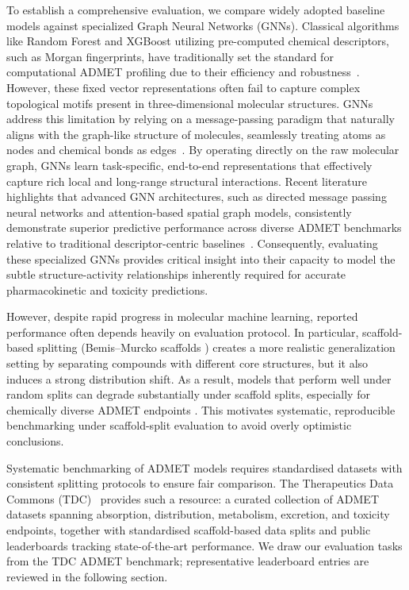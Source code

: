 \documentclass[12pt]{article}
\begin{document}
To establish a comprehensive evaluation, we compare widely adopted baseline models against specialized Graph Neural Networks (GNNs). Classical algorithms like Random Forest and XGBoost utilizing pre-computed chemical descriptors, such as Morgan fingerprints, have traditionally set the standard for computational ADMET profiling due to their efficiency and robustness~\cite{wu2018moleculenet}. However, these fixed vector representations often fail to capture complex topological motifs present in three-dimensional molecular structures. GNNs address this limitation by relying on a message-passing paradigm that naturally aligns with the graph-like structure of molecules, seamlessly treating atoms as nodes and chemical bonds as edges~\cite{gilmer2017neural}. By operating directly on the raw molecular graph, GNNs learn task-specific, end-to-end representations that effectively capture rich local and long-range structural interactions. Recent literature highlights that advanced GNN architectures, such as directed message passing neural networks and attention-based spatial graph models, consistently demonstrate superior predictive performance across diverse ADMET benchmarks relative to traditional descriptor-centric baselines~\cite{yang2019analyzing, xiong2020pushing}. Consequently, evaluating these specialized GNNs provides critical insight into their capacity to model the subtle structure-activity relationships inherently required for accurate pharmacokinetic and toxicity predictions.

However, despite rapid progress in molecular machine learning, reported performance often depends heavily on evaluation protocol. In particular, scaffold-based splitting (Bemis–Murcko scaffolds \cite{doi:10.1021/jm9602928}) creates a more realistic generalization setting by separating compounds with different core structures, but it also induces a strong distribution shift. As a result, models that perform well under random splits can degrade substantially under scaffold splits, especially for chemically diverse ADMET endpoints \cite{chemberta2, yang2019analyzing}. This motivates systematic, reproducible benchmarking under scaffold-split evaluation to avoid overly optimistic conclusions.

Systematic benchmarking of ADMET models requires standardised datasets with consistent splitting protocols to ensure fair comparison. The Therapeutics Data Commons (TDC)~\cite{huang2021therapeuticsdatacommonsmachine} provides such a resource: a curated collection of ADMET datasets spanning absorption, distribution, metabolism, excretion, and toxicity endpoints, together with standardised scaffold-based data splits and public leaderboards tracking state-of-the-art performance. We draw our evaluation tasks from the TDC ADMET benchmark; representative leaderboard entries are reviewed in the following section.
\end{document}
